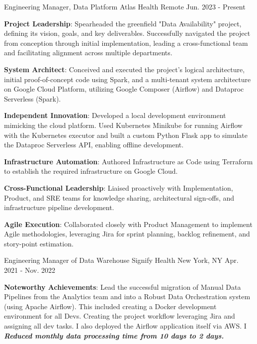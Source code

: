 \begin{cventries}
  \cventry
  {Engineering Manager, Data Platform}
  {Atlas Health}
  {Remote}
  {Jun. 2023 - Present}
  {
    \begin{cvitems}
        \item {\textbf{Project Leadership}: Spearheaded the greenfield "Data Availability" project, defining its vision, goals, and key deliverables. Successfully navigated the project from conception through initial implementation, leading a cross-functional team and facilitating alignment across multiple departments.}
        \item {\textbf{System Architect}: Conceived and executed the project's logical architecture, initial proof-of-concept code using Spark, and a multi-tenant system architecture on Google Cloud Platform, utilizing Google Composer (Airflow) and Dataproc Serverless (Spark).}
        \item {\textbf{Independent Innovation}: Developed a local development environment mimicking the cloud platform. Used Kubernetes Minikube for running Airflow with the Kubernetes executor and built a custom Python Flask app to simulate the Dataproc Serverless API, enabling offline development.}
        \item {\textbf{Infrastructure Automation}: Authored Infrastructure as Code using Terraform to establish the required infrastructure on Google Cloud.}
        \item {\textbf{Cross-Functional Leadership}: Liaised proactively with Implementation, Product, and SRE teams for knowledge sharing, architectural sign-offs, and infrastructure pipeline development.}
        \item {\textbf{Agile Execution}: Collaborated closely with Product Management to implement Agile methodologies, leveraging Jira for sprint planning, backlog refinement, and story-point estimation.}
    \end{cvitems}
  }
  \cventry
    {Engineering Manager of Data Warehouse}
    {Signify Health}
    {New York, NY}
    {Apr. 2021 - Nov. 2022}
    {
      \begin{cvitems}
          \item {\textbf{Noteworthy Achievements}: Lead the successful migration of Manual Data Pipelines from the Analytics team and into a Robust Data Orchestration system (using Apache Airflow). This included creating a Docker development environment for all Devs. Creating the project workflow leveraging Jira and assigning all dev tasks. I also deployed the Airflow application itself via AWS. I \textbf{\emph{Reduced monthly data processing time from 10 days to 2 days.}}
}
\end{cvitems}}
\end{cventries}
